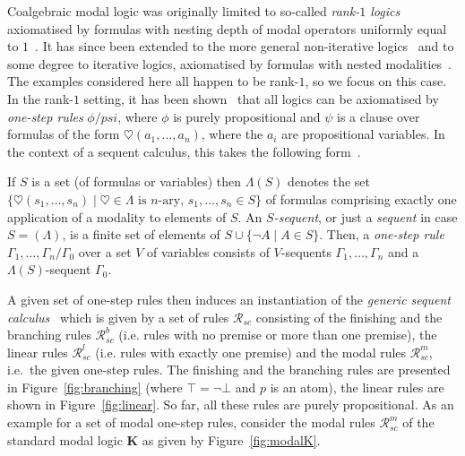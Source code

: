 \documentclass{entcs} \usepackage{entcsmacro}
\newcommand{\hearts}{\heartsuit}
\begin{document}
Coalgebraic modal logic was originally limited to so-called
\emph{rank-$1$ logics} axiomatised by formulas with nesting depth of
modal operators uniformly equal to $1$~\cite{Schroder05}. It has since
been extended to the more general non-iterative
logics~\cite{SchroderPattinson08d} and to some degree to iterative
logics, axiomatised by formulas with nested
modalities~\cite{SchroderPattinson08PHQ}. The examples considered here
all happen to be rank-$1$, so we focus on this case. In the rank-$1$
setting, it has been shown~\cite{Schroder05} that all logics can be
axiomatised by \emph{one-step rules} $\phi/psi$, where $\phi$ is
purely propositional and $\psi$ is a clause over formulas of the form
$\hearts(a_1,\dots,a_n)$, where the $a_i$ are propositional
variables. In the context of a sequent calculus, this takes the
following form~\cite{PattinsonSchroder08b}.
\begin{definition}
  If $S$ is a set (of formulas or variables) then $\Lambda(S)$ denotes
  the set $\lbrace \hearts(s_1, \dots, s_n) \mid \hearts \in \Lambda
  \mbox{ is $n$-ary, } s_1, \dots, s_n \in S \rbrace$ of formulas
  comprising exactly one application of a modality to elements of
  $S$. An \emph{$S$-sequent}, or just a \emph{sequent} in case
  $S=(\Lambda)$, is a finite set of elements of $S \cup \lbrace
  \neg A \mid A \in S \rbrace$. Then, a \emph{one-step rule}
  $\Gamma_1,\dots,\Gamma_n/\Gamma_0$ over a set $V$ of variables
  consists of $V$-sequents $\Gamma_1,\dots,\Gamma_n$ and a
  $\Lambda(S)$-sequent $\Gamma_0$.
\end{definition}
\noindent A given set of one-step rules then induces an instantiation
of the \emph{generic sequent calculus}~\cite{PattinsonSchroder08b}
which is given by a set of rules $\mathcal{R}_{sc}$ consisting of the
finishing and the branching rules $\mathcal{R}^b_{sc}$ (i.e. rules
with no premise or more than one premise), the linear rules
$\mathcal{R}^l_{sc}$ (i.e. rules with exactly one premise) and the
modal rules $\mathcal R^m_{sc}$, i.e.\ the given one-step rules. The
finishing and the branching rules are presented in
Figure~\ref{fig:branching} (where $\top=\neg\bot$ and $p$ is an atom),
the linear rules are shown in Figure~\ref{fig:linear}. So far, all
these rules are purely propositional. As an example for a set of modal
one-step rules, consider the modal rules $\mathcal R^m_{sc}$ of the
standard modal logic \textbf{K} as given by Figure~\ref{fig:modalK}.
\end{document}
